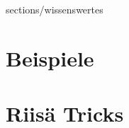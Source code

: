 \newcommand{\titleinfo}{Wechsel- \& Drehstromtechnik - HS2019}
\newcommand{\authorinfo}{Atomjoggeli \& Ben-Ji, Braun \& Co, J.Rast, S.K\"orner, C.Gwerder, M. Giger}









\newpage

 {sections/wissenswertes}

\newpage
\section{Beispiele}


\newpage









\newpage
\section{Riis\"a Tricks}






